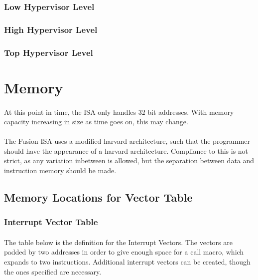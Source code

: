 \documentclass[letterpaper, 11pt]{article}
\begin{document}
\subsubsection{Low Hypervisor Level}
\subsubsection{High Hypervisor Level}
\subsubsection{Top Hypervisor Level}

\section{Memory}
\paragraph{}At this point in time, the ISA only handles 32 bit addresses.
With memory capacity increasing in size as time goes on, this may change. %
\paragraph{} The Fusion-ISA uses a modified harvard architecture, such that the programmer should have the appearance of a harvard architecture.
Compliance to this is not strict, as any variation inbetween is allowed, but the separation between data and instruction memory should be made.

\subsection{Memory Locations for Vector Table}
\subsubsection{Interrupt Vector Table}
\paragraph{} The table below is the definition for the Interrupt Vectors. The vectors are padded by two addresses
in order to give enough space for a call macro, which expands to two instructions. Additional interrupt vectors 
can be created, though the ones specified are necessary.
\end{document}
